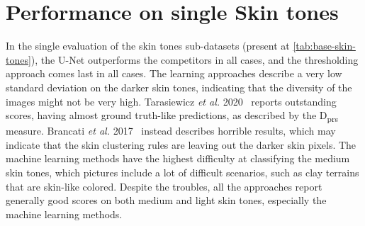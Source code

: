 \FloatBarrier
\section{Performance on single Skin tones}

In the single evaluation of the skin tones sub-datasets (present at \autoref{tab:base-skin-tones}), the U-Net outperforms the competitors in all cases, and the thresholding approach comes last in all cases.
The learning approaches describe a very low standard deviation on the darker skin tones, indicating that the diversity of the images might not be very high.
Tarasiewicz \textit{et al.} 2020~\cite{tarasiewicz2020skinny} reports outstanding scores, having almost ground truth-like predictions, as described by the D\textsubscript{prs} measure.
Brancati \textit{et al.} 2017~\cite{brancati2017human} instead describes horrible results, which may indicate that the skin clustering rules are leaving out the darker skin pixels.
The machine learning methods have the highest difficulty at classifying the medium skin tones, which pictures include a lot of difficult scenarios, such as clay terrains that are skin-like colored.
Despite the troubles, all the approaches report generally good scores on both medium and light skin tones, especially the machine learning methods.


